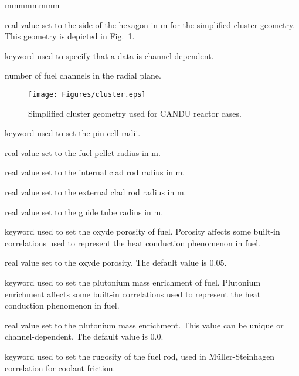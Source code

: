 \begin{ListeDeDescription}{mmmmmmmm}
\item[\dusa{pitch}] real value set to the side of the hexagon in m for the simplified cluster geometry. This geometry is depicted in Fig.~\ref{fig:Cluster}.

\item[\moc{CHAN}] keyword used to specify that a data is channel-dependent.

\item[\dusa{nch}] number of fuel channels in the radial plane.

\begin{figure}[h!]
  \begin{center}
    \texttt{[image: Figures/cluster.eps]} 
\caption{Simplified cluster geometry used for CANDU reactor cases.}\label{fig:Cluster}
  \end{center}
\end{figure}

\item[\moc{RADIUS}] keyword used to set the pin-cell radii.

\item[\dusa{r1}] real value set to the fuel pellet radius in m.

\item[\dusa{r2}] real value set to the internal clad rod radius in m.

\item[\dusa{r3}] real value set to the external clad rod radius in m.

\item[\dusa{r4}] real value set to the guide tube radius in m.

\item[\moc{POROS}] keyword used to set the oxyde porosity of fuel. Porosity affects some built-in correlations
used to represent the heat conduction phenomenon in fuel.

\item[\dusa{poros}] real value set to the oxyde porosity. The default value is 0.05.

\item[\moc{PUFR}] keyword used to set the plutonium mass enrichment of fuel. Plutonium enrichment affects some built-in correlations
used to represent the heat conduction phenomenon in fuel.

\item[\dusa{pufr}] real value set to the plutonium mass enrichment. This value can be unique or channel-dependent. The default value is 0.0.

\item[\moc{F-RUG}] keyword used to set the rugosity of the fuel rod, used in M\"uller-Steinhagen correlation for coolant friction.


\end{ListeDeDescription}
